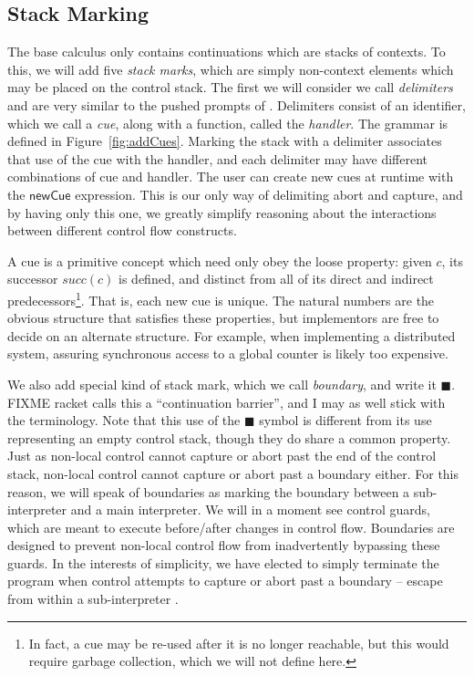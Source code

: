 \documentclass[11pt]{article}
\newcommand{\newhandler}{\textsf{newCue}}
\begin{document}
\subsection{Stack Marking}

The base calculus only contains continuations which are stacks of contexts.
To this, we will add five \emph{stack marks}, which are simply non-context elements which may be placed on the control stack.
The first we will consider we call \emph{delimiters} and are very similar to the pushed prompts of \cite{MFDC}.
Delimiters consist of an identifier, which we call a \emph{cue}, along with a function, called the \emph{handler}.
The grammar is defined in Figure~\ref{fig:addCues}.
Marking the stack with a delimiter associates that use of the cue with the handler, and each delimiter may have different combinations of cue and handler.
The user can create new cues at runtime with the $\newhandler$ expression.
This is our only way of delimiting abort and capture, and by having only this one, we greatly simplify reasoning about the interactions between different control flow constructs.

A cue is a primitive concept which need only obey the loose property:
given $c$, its successor $succ(c)$ is defined, and distinct from all of its direct and indirect predecessors\footnote{In fact, a cue may be re-used after it is no longer reachable, but this would require garbage collection, which we will not define here.}.
That is, each new cue is unique.
The natural numbers are the obvious structure that satisfies these properties, but implementors are free to decide on an alternate structure.
For example, when implementing a distributed system, assuring synchronous access to a global counter is likely too expensive.

We also add special kind of stack mark, which we call \emph{boundary}, and write it $\blacksquare$.
FIXME racket calls this a ``continuation barrier'', and I may as well stick with the terminology.
Note that this use of the $\blacksquare$ symbol is different from its use representing an empty control stack, though they do share a common property.
Just as non-local control cannot capture or abort past the end of the control stack, non-local control cannot capture or abort past a boundary either.
For this reason, we will speak of boundaries as marking the boundary between a sub-interpreter and a main interpreter.
We will in a moment see control guards, which are meant to execute before/after changes in control flow.
Boundaries are designed to prevent non-local control flow from inadvertently bypassing these guards.
In the interests of simplicity, we have elected to simply terminate the program when control attempts to capture or abort past a boundary -- escape from within a sub-interpreter .
\end{document}
